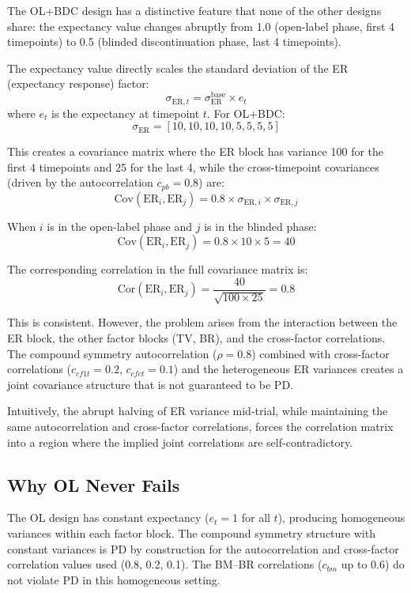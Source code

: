 \documentclass[11pt]{article}
\begin{document}
The OL+BDC design has a distinctive feature that none of the
other designs share: the expectancy value changes abruptly from
1.0 (open-label phase, first 4 timepoints) to 0.5 (blinded
discontinuation phase, last 4 timepoints).

The expectancy value directly scales the standard deviation of
the ER (expectancy response) factor:
\[
\sigma_{\text{ER},t} =
  \sigma_{\text{ER}}^{\text{base}} \times e_t
\]
where $e_t$ is the expectancy at timepoint $t$. For OL+BDC:
\[
\sigma_{\text{ER}} =
  [10, 10, 10, 10, 5, 5, 5, 5]
\]

This creates a covariance matrix where the ER block has
variance 100 for the first 4 timepoints and 25 for the last 4,
while the cross-timepoint covariances (driven by the
autocorrelation $c_{pb} = 0.8$) are:
\[
\text{Cov}(\text{ER}_i, \text{ER}_j) =
  0.8 \times \sigma_{\text{ER},i} \times
  \sigma_{\text{ER},j}
\]

When $i$ is in the open-label phase and $j$ is in the blinded
phase:
\[
\text{Cov}(\text{ER}_i, \text{ER}_j) =
  0.8 \times 10 \times 5 = 40
\]

The corresponding correlation in the full covariance matrix is:
\[
\text{Cor}(\text{ER}_i, \text{ER}_j) =
  \frac{40}{\sqrt{100 \times 25}} = 0.8
\]

This is consistent. However, the problem arises from the
interaction between the ER block, the other factor blocks (TV,
BR), and the cross-factor correlations. The compound symmetry
autocorrelation ($\rho = 0.8$) combined with cross-factor
correlations ($c_{cf1t} = 0.2$, $c_{cfct} = 0.1$) and the
heterogeneous ER variances creates a joint covariance structure
that is not guaranteed to be PD.

Intuitively, the abrupt halving of ER variance mid-trial, while
maintaining the same autocorrelation and cross-factor
correlations, forces the correlation matrix into a region where
the implied joint correlations are self-contradictory.

\subsection{Why OL Never Fails}

The OL design has constant expectancy ($e_t = 1$ for all $t$),
producing homogeneous variances within each factor block. The
compound symmetry structure with constant variances is PD by
construction for the autocorrelation and cross-factor
correlation values used (0.8, 0.2, 0.1). The BM--BR
correlations ($c_{bm}$ up to 0.6) do not violate PD in this
homogeneous setting.
\end{document}

